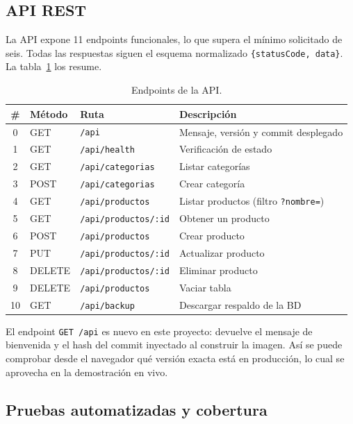\documentclass[12pt,letterpaper]{article}
\begin{document}
\subsection{API REST}

La API expone 11 endpoints funcionales, lo que supera el mínimo solicitado de seis. Todas las respuestas siguen el esquema normalizado \texttt{\{statusCode, data\}}. La tabla~\ref{tab:endpoints} los resume.

\begin{table}[H]
\centering\small
\begin{tabular}{c l l l}
\toprule
\# & Método & Ruta & Descripción \\
\midrule
0 & GET & \texttt{/api} & Mensaje, versión y commit desplegado \\
1 & GET & \texttt{/api/health} & Verificación de estado \\
2 & GET & \texttt{/api/categorias} & Listar categorías \\
3 & POST & \texttt{/api/categorias} & Crear categoría \\
4 & GET & \texttt{/api/productos} & Listar productos (filtro \texttt{?nombre=}) \\
5 & GET & \texttt{/api/productos/:id} & Obtener un producto \\
6 & POST & \texttt{/api/productos} & Crear producto \\
7 & PUT & \texttt{/api/productos/:id} & Actualizar producto \\
8 & DELETE & \texttt{/api/productos/:id} & Eliminar producto \\
9 & DELETE & \texttt{/api/productos} & Vaciar tabla \\
10 & GET & \texttt{/api/backup} & Descargar respaldo de la BD \\
\bottomrule
\end{tabular}
\caption{Endpoints de la API.}
\label{tab:endpoints}
\end{table}

El endpoint \texttt{GET /api} es nuevo en este proyecto: devuelve el mensaje de bienvenida y el hash del commit inyectado al construir la imagen. Así se puede comprobar desde el navegador qué versión exacta está en producción, lo cual se aprovecha en la demostración en vivo.

\subsection{Pruebas automatizadas y cobertura}
\end{document}
